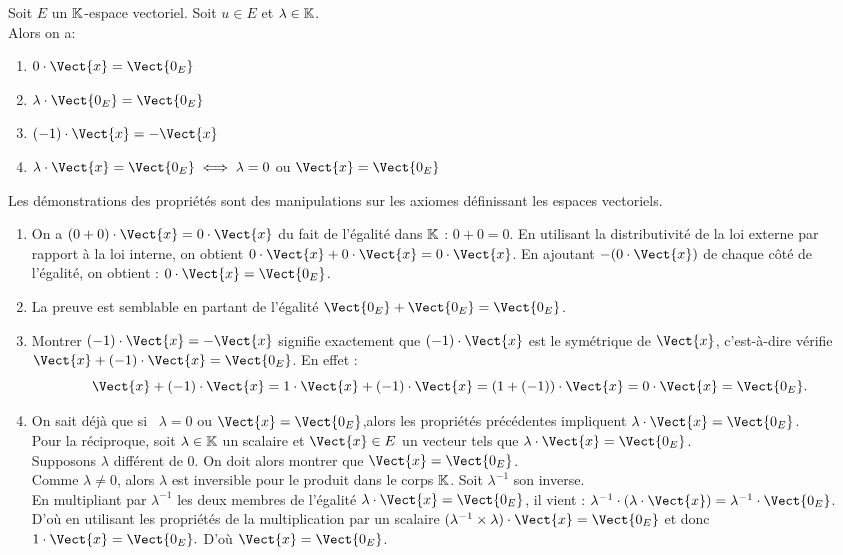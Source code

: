 \documentclass{book}
\begin{document}
\begin{Proposition}
Soit $E$ un $\mathbb{K} $-espace vectoriel. Soit $u \in E$ et $\lambda \in \mathbb{K}$.\\
Alors on a:
 \begin{enumerate}
 \item $0 \cdot \Vect{x} = \Vect{0_E}$
 \item $\lambda \cdot \Vect{0_E} = \Vect{0_E}$
 \item $(-1)\cdot \Vect{x} = -\Vect{x}$
 \item $\lambda \cdot \Vect{x} = \Vect{0_E} \iff \lambda = 0$  ou  $\Vect{x} = \Vect{0_E}$
 \end{enumerate}
\end{Proposition}

\begin{Demonstration}
Les démonstrations des propriétés sont des manipulations sur les axiomes définissant les espaces vectoriels.

\begin{enumerate}
  \item On a $(0+0)\cdot \Vect{x}=0 \cdot \Vect{x}$ du fait de l'égalité dans $\mathbb{K}$ : $0+0=0$. En utilisant la distributivité de la loi externe par rapport à la loi interne, on obtient $0 \cdot \Vect{x} +0 \cdot \Vect{x} =0 \cdot \Vect{x}$. En ajoutant $-(0\cdot \Vect{x})$ de chaque côté de l'égalité, on obtient :
    $0 \cdot \Vect{x}=\Vect{0_{E}}$.
  \item La preuve est semblable en partant de l'égalité $\Vect{0_{E}}+\Vect{0_{E}}=\Vect{0_{E}}$.

  \item Montrer $(-1)\cdot \Vect{x} = -\Vect{x}$ signifie exactement que $(-1)\cdot \Vect{x}$
  est le symétrique de $\Vect{x}$, c'est-à-dire vérifie  $\Vect{x} + (-1)\cdot \Vect{x} = \Vect{0_E}$.
  En effet :
  $$\Vect{x}+(-1)\cdot \Vect{x}=1\cdot \Vect{x}+(-1) \cdot \Vect{x}=\left ( 1+ (-1)\right ) \cdot \Vect{x}=0 \cdot \Vect{x}= \Vect{0_{E}}.$$

  \item On sait déjà que si \ $\lambda = 0$  ou  $\Vect{x} = \Vect{0_E}$,alors les propriétés précédentes
  impliquent $\lambda \cdot \Vect{x} = \Vect{0_E}$.\\
  Pour la réciproque, soit $\lambda \in \mathbb{K}$ un scalaire et $\Vect{x} \in E$  un vecteur
  tels que $\lambda \cdot \Vect{x}=\Vect{0_{E}}$.\\
  Supposons $\lambda$ différent de $0$. On doit alors montrer que $\Vect{x}=\Vect{0_E}$.\\
  Comme $\lambda\neq0$, alors $\lambda$ est inversible pour le produit dans le corps $\mathbb{K}$. Soit
  $\lambda ^{-1}$ son inverse.\\
En multipliant par $\lambda^{-1}$ les deux membres de l'égalité $\lambda \cdot \Vect{x} = \Vect{0_{E}}$, il vient :
  $\lambda^{-1} \cdot (\lambda \cdot \Vect{x})=\lambda ^{-1} \cdot \Vect{0_{E}}$.\\
  D'où en utilisant les propriétés de la multiplication par un scalaire
    $(\lambda^{-1} \times \lambda) \cdot \Vect{x}=\Vect{0_{E}}$ et donc $1 \cdot \Vect{x}=\Vect{0_{E}}.$
D'où $\Vect{x}=\Vect{0_{E}}$.


\end{enumerate}
\end{Demonstration}
\end{document}
